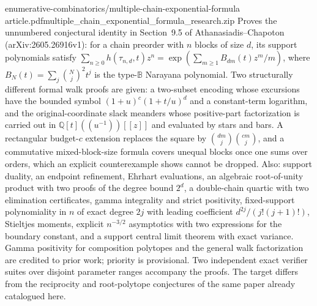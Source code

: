 {enumerative-combinatorics/multiple-chain-exponential-formula}
{article.pdf}{multiple\_chain\_exponential\_formula\_research.zip}
{Proves the unnumbered conjectural identity in Section~9.5 of
Athanasiadis--Chapoton (arXiv:2605.26916v1): for a chain preorder with $n$
blocks of size $d$, its support polynomials satisfy
$\sum_{n\ge0}h(\tau_{n,d},t)z^n=
\exp(\sum_{m\ge1}B_{dm}(t)z^m/m)$, where
$B_N(t)=\sum_j\binom Nj^2t^j$ is the type-$\mathbb B$ Narayana polynomial.
Two structurally different formal walk proofs are given: a two-subset
encoding whose excursions have the bounded symbol $(1+u)^c(1+t/u)^d$ and a
constant-term logarithm, and the original-coordinate slack meanders whose
positive-part factorization is carried out in
$\mathbb{Q}[t]((u^{-1}))[[z]]$ and
evaluated by stars and bars.
A rectangular budget-$c$ extension replaces the square by
$\binom{dm}{j}\binom{cm}{j}$, and a commutative mixed-block-size formula
covers unequal blocks once one sums over orders, which an explicit
counterexample shows cannot be dropped.
Also: support duality, an endpoint refinement, Ehrhart evaluations, an
algebraic root-of-unity product with two proofs of the degree bound $2^d$,
a double-chain quartic with two elimination certificates, gamma integrality
and strict positivity, fixed-support polynomiality in $n$ of exact degree
$2j$ with leading coefficient $d^{2j}/(j!(j+1)!)$, Stieltjes moments,
explicit $n^{-3/2}$ asymptotics with two expressions for the boundary
constant, and a support central limit theorem with exact variance.
Gamma positivity for composition polytopes and the general walk factorization
are credited to prior work; priority is provisional. Two independent exact
verifier suites over disjoint parameter ranges accompany the proofs.
The target differs from the reciprocity and root-polytope conjectures of the
same paper already catalogued here.}

